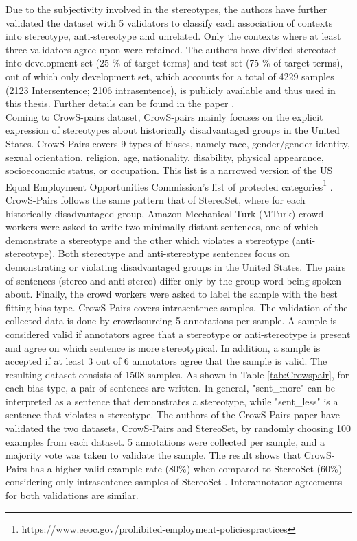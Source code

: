 Due to the subjectivity involved in the stereotypes, the authors have further validated the dataset with 5 validators to classify each association of contexts into stereotype, anti-stereotype and unrelated. Only the contexts where at least three validators agree upon were retained. The authors have divided stereotset into development set (25 \% of target terms) and test-set (75 \% of target terms), out of which only development set, which accounts for a total of 4229 samples (2123 Intersentence; 2106 intrasentence), is publicly available and thus used in this thesis. Further details can be found in the paper \cite{nadeem2020stereoset}.
\\

Coming to CrowS-pairs \cite{nangia2020crows} dataset, CrowS-pairs mainly focuses on the explicit expression of stereotypes about historically disadvantaged groups in the United States. CrowS-Pairs covers 9 types of biases, namely race, gender/gender identity, sexual orientation, religion, age, nationality, disability, physical appearance, socioeconomic status, or occupation. This list is a narrowed version of the US Equal Employment Opportunities Commission's list of protected categories\footnote{https://www.eeoc.gov/prohibited-employment-policiespractices} \cite{nangia2020crows}. CrowS-Pairs follows the same pattern that of StereoSet\cite{nadeem2020stereoset}, where for each historically disadvantaged group, Amazon Mechanical Turk (MTurk) crowd workers were asked to write two minimally distant sentences, one of which demonstrate a stereotype and the other which violates a stereotype (anti-stereotype). Both stereotype and anti-stereotype sentences focus on demonstrating or violating disadvantaged groups in the United States. The pairs of sentences (stereo and anti-stereo) differ only by the group word being spoken about. Finally, the crowd workers were asked to label the sample with the best fitting bias type. CrowS-Pairs covers intrasentence samples. The validation of the collected data is done by crowdsourcing 5 annotations per sample. A sample is considered valid if annotators agree that a stereotype or anti-stereotype is
present and agree on which sentence is more stereotypical\cite{nangia2020crows}. In addition, a sample is accepted if at least 3 out of 6 annotators agree that the sample is valid. The resulting dataset consists of 1508 samples. As shown in Table \ref{tab:Crowspair}, for each bias type, a pair of sentences are written. In general, "sent\_more" can be interpreted as a sentence that demonstrates a stereotype, while "sent\_less" is a sentence that violates a stereotype. The authors of the CrowS-Pairs paper have validated the two datasets, CrowS-Pairs and StereoSet, by randomly choosing 100 examples from each dataset. 5 annotations were collected per sample, and a majority vote was taken to validate the sample. The result shows that CrowS-Pairs has a higher valid example rate (80\%) when compared to StereoSet (60\%) considering only intrasentence samples of StereoSet \cite{nangia2020crows}. Interannotator agreements for both validations are similar.
\\


